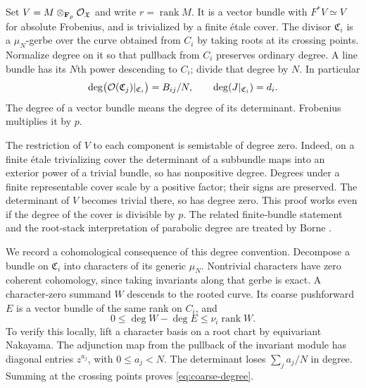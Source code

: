 Set $V=M\otimes_{\mathbf F_p}\mathcal O_{\mathfrak X}$ and write $r=\operatorname{rank}M$. It is a vector bundle with $F^*V\simeq V$ for absolute Frobenius, and is trivialized by a finite \'etale cover. The divisor $\mathfrak C_i$ is a $\mu_N$-gerbe over the curve obtained from $C_i$ by taking roots at its crossing points. Normalize degree on it so that pullback from $C_i$ preserves ordinary degree. A line bundle has its $N$th power descending to $C_i$; divide that degree by $N$. In particular
\begin{equation}\label{eq:root-degrees}
 \deg\bigl(\mathcal O(\mathfrak C_j)|_{\mathfrak C_i}\bigr)=B_{ij}/N,
 \qquad \deg(J|_{\mathfrak C_i})=d_i.
\end{equation}
The degree of a vector bundle means the degree of its determinant. Frobenius multiplies it by $p$.

The restriction of $V$ to each component is semistable of degree zero. Indeed, on a finite \'etale trivializing cover the determinant of a subbundle maps into an exterior power of a trivial bundle, so has nonpositive degree. Degrees under a finite representable cover scale by a positive factor; their signs are preserved. The determinant of $V$ becomes trivial there, so has degree zero. This proof works even if the degree of the cover is divisible by $p$. The related finite-bundle statement and the root-stack interpretation of parabolic degree are treated by Borne \cite[Theorems 4--5 and Proposition 6, author pp.~12,17,22]{Borne}.

We record a cohomological consequence of this degree convention. Decompose a bundle on $\mathfrak C_i$ into characters of its generic $\mu_N$. Nontrivial characters have zero coherent cohomology, since taking invariants along that gerbe is exact. A character-zero summand $W$ descends to the rooted curve. Its coarse pushforward $E$ is a vector bundle of the same rank on $C_i$, and
\begin{equation}\label{eq:coarse-degree}
 0\leq\deg W-\deg E\leq\nu_i\operatorname{rank}W.
\end{equation}
To verify this locally, lift a character basis on a root chart by equivariant Nakayama. The adjunction map from the pullback of the invariant module has diagonal entries $z^{a_j}$, with $0\leq a_j<N$. The determinant loses $\sum_j a_j/N$ in degree. Summing at the crossing points proves \eqref{eq:coarse-degree}.

